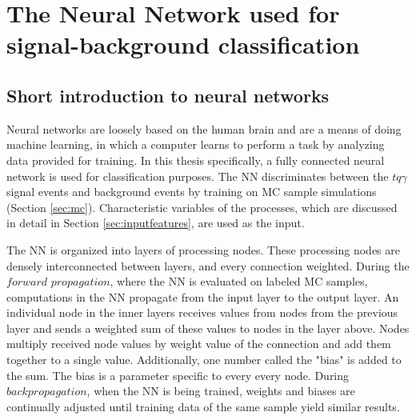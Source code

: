 \chapter{The Neural Network used for signal-background classification}
\section{Short introduction to neural networks}
Neural networks are loosely based on the human brain and are a means of doing machine learning, in which a computer learns to perform a task by analyzing data provided for training. In this thesis specifically, 
a fully connected neural network is used for classification purposes. The NN discriminates between the $tq\gamma$ signal events and background events by training on MC sample simulations (Section \ref{sec:mc}). 
Characteristic variables of the processes, which are discussed in detail in Section \ref{sec:inputfeatures}, are used as the input.

The NN is organized into layers of processing nodes. These processing nodes are densely interconnected between layers, and every connection weighted. 
During the $forward$ $propagation$, where the NN is evaluated on labeled MC samples, computations in the NN propagate from the input layer to the output layer. An individual node in the inner layers receives values from nodes from the previous layer and sends a weighted sum of these values to nodes in the layer above. 
Nodes multiply received node values by weight value of the connection and add them together to a single value. Additionally, one number called the "bias" is added to the sum. The bias is a parameter specific to every every node. During $backpropagation$, when the NN is being trained, weights and biases are continually adjusted until training data of the same sample yield similar results.   
 
